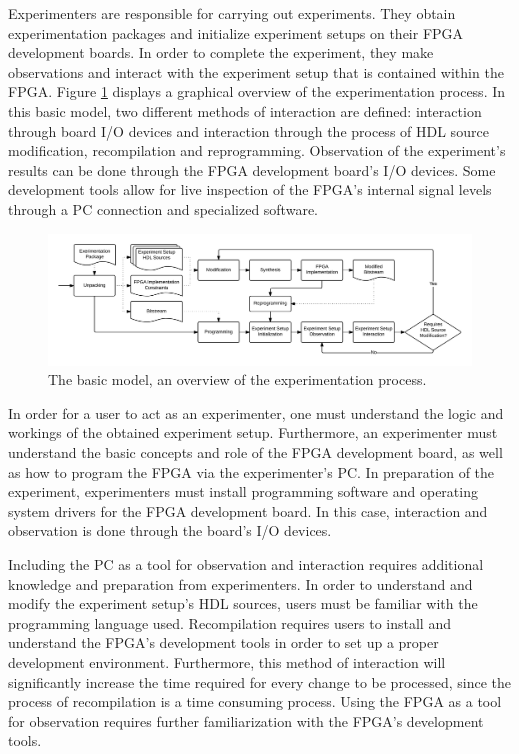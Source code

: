 \documentclass[main.tex]{subfiles}
\begin{document}
Experimenters are responsible for carrying out experiments. They obtain experimentation packages and initialize experiment setups on their FPGA development boards. In order to complete the experiment, they make observations and interact with the experiment setup that is contained within the FPGA. Figure \ref{fig:process-experimentation-basic} displays a graphical overview of the experimentation process. In this basic model, two different methods of interaction are defined: interaction through board I/O devices and interaction through the process of HDL source modification, recompilation and reprogramming. Observation of the experiment's results can be done through the FPGA development board's I/O devices. Some development tools allow for live inspection of the FPGA's internal signal levels through a PC connection and specialized software.

\begin{figure}[h]
    \centering
    \caption{The basic model, an overview of the experimentation process.}
    \label{fig:process-experimentation-basic}
    \includegraphics[width=\textwidth]{img/processes-basic-experimentation}
\end{figure}

In order for a user to act as an experimenter, one must understand the logic and workings of the obtained experiment setup. Furthermore, an experimenter must understand the basic concepts and role of the FPGA development board, as well as how to program the FPGA via the experimenter's PC. In preparation of the experiment, experimenters must install programming software and operating system drivers for the FPGA development board. In this case, interaction and observation is done through the board's I/O devices. 

Including the PC as a tool for observation and interaction requires additional knowledge and preparation from experimenters. In order to understand and modify the experiment setup's HDL sources, users must be familiar with the programming language used. Recompilation requires users to install and understand the FPGA's development tools in order to set up a proper development environment. Furthermore, this method of interaction will significantly increase the time required for every change to be processed, since the process of recompilation is a time consuming process. Using the FPGA as a tool for observation requires further familiarization with the FPGA's development tools.
\end{document}
